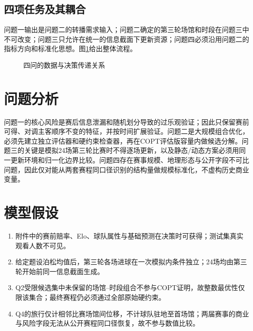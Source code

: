 \documentclass[UTF8,a4paper,zihao=-4,fontset=fandol]{ctexart}
\begin{document}
\subsection{四项任务及其耦合}
问题一输出是问题二的转播需求输入；问题二确定的第三轮场馆和时段在问题三中不可改变；问题三只允许在统一的信息截面下更新资源；问题四必须沿用问题二的指标方向和标准化思想。图\ref{fig:flow}给出整体流程。

\begin{figure}[H]
  \centering
  \caption{四问的数据与决策传递关系}
  \label{fig:flow}
\end{figure}

\section{问题分析}
问题一的核心风险是赛后信息泄漏和随机划分导致的过乐观验证；因此只保留赛前可得、对调主客顺序不变的特征，并按时间扩展验证。问题二是大规模组合优化，必须先建立独立评估器和硬约束检查器，再在COPT评估版容量内做候选分解。问题三的关键是模拟24场第三轮比赛时不得逐场更新，以及静态/动态方案必须用同一更新环境和归一化边界比较。问题四存在赛事规模、地理形态与公开字段不可比问题，因此仅对能从两套赛程同口径识别的结构量做规模标准化，不虚构历史商业变量。

\section{模型假设}
\begin{enumerate}
  \item 附件中的赛前赔率、Elo、球队属性与基础预测在决策时可获得；测试集真实观看人数不可见。
  \item 给定题设泊松均值后，第三轮各场进球在一次模拟内条件独立；24场均由第三轮开始前同一信息截面生成。
  \item Q2受限候选集中未保留的场馆--时段组合不参与COPT证明，故整数最优性仅限该集合；最终赛程仍必须通过全部原始硬约束。
  \item Q4的旅行仅计相邻比赛场馆间位移，不计球队驻地至首场馆；两届赛事的商业与风险字段无法从公开赛程同口径恢复，故不参与数值比较。
\end{enumerate}
\end{document}
